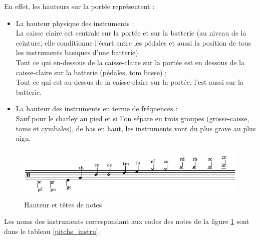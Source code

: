 En effet, les hauteurs sur la portée représentent :
\begin{itemize}
	\item La hauteur physique des instruments :\\
	La caisse claire est centrale sur la portée et sur la batterie (au niveau de la ceinture, elle conditionne l’écart entre les pédales et aussi la position de tous les instruments basiques d’une batterie).\\
	Tout ce qui en-dessous de la caisse-claire sur la portée est en dessous de la caisse-claire sur la batterie (pédales, tom basse) ;\\
	Tout ce qui est au-dessus de la caisse-claire sur la portée, l’est aussi sur la batterie.\\
	\item La hauteur des instruments en terme de fréquences :\\
	Sauf pour le charley au pied et si l’on sépare en trois groupes (grosse-caisse, toms et cymbales), de bas en haut, les instruments vont du plus grave au plus aigu.
\end{itemize}
\begin{figure}[!h]
	\centering
	\includegraphics[height=25mm, width=130mm]{z_images/3_methodes/0_notation_de_la_batterie/2_hauteurs_et_tete_de_notes.png}
	\caption{Hauteur et têtes de notes}
	\label{Hauteur et têtes de notes}
\end{figure}
Les noms des instruments correspondant aux codes des notes 
de la figure \ref{Hauteur et têtes de notes} sont dans le tableau \ref{pitchs_instru}.

